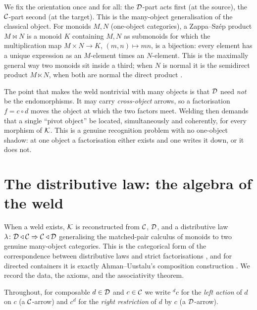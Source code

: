 We fix the orientation once and for all: the $\mathcal{D}$-part acts first (at the source),
the $\mathcal{C}$-part second (at the target). This is the many-object generalisation of
the classical object. For monoids $M,N$ (one-object categories), a Zappa--Sz\'ep
product $M\bowtie N$ is a monoid $K$ containing $M,N$ as submonoids for which the
multiplication map $M\times N\to K$, $(m,n)\mapsto mn$, is a bijection: every
element has a unique expression as an $M$-element times an $N$-element. This is the
maximally general way two monoids sit inside a third; when $N$ is normal it is the
semidirect product $M\ltimes N$, when both are normal the direct product
\cite{brin}.

The point that makes the weld nontrivial with many objects is that $\mathcal{D}$ need
\emph{not} be the endomorphisms. It may carry \emph{cross-object} arrows, so a
factorisation $f=c\circ d$ moves the object at which the two factors meet. Welding
then demands that a single ``pivot object'' be located, simultaneously and
coherently, for every morphism of $\mathcal{K}$. This is a genuine recognition problem with
no one-object shadow: at one object a factorisation either exists and one writes it
down, or it does not.

\section{The distributive law: the algebra of the weld}\label{sec:zs-law}

When a weld exists, $\mathcal{K}$ is reconstructed from $\mathcal{C}$, $\mathcal{D}$, and a distributive law
$\lambda\colon\mathcal{D}\triangleleft\mathcal{C}\Rightarrow\mathcal{C}\triangleleft\mathcal{D}$ generalising the matched-pair calculus
of monoids to two genuine many-object categories. This is the categorical form of
the correspondence between distributive laws and strict factorisations
\cite{rw,street}, and for directed containers it is exactly Ahman--Uustalu's
composition construction \cite{AhmanUustaluDL}. We record the data, the axioms, and
the associativity theorem.

Throughout, for composable $d\in\mathcal{D}$ and $c\in\mathcal{C}$ we write ${}^{d}c$ for the
\emph{left action} of $d$ on $c$ (a $\mathcal{C}$-arrow) and $c^{d}$ for the \emph{right
restriction} of $d$ by $c$ (a $\mathcal{D}$-arrow).

